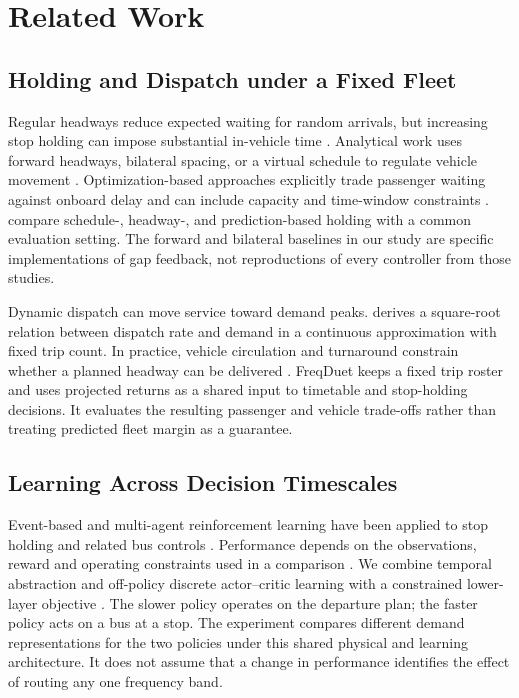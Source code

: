 \section{Related Work}
\label{sec:related}

\subsection{Holding and Dispatch under a Fixed Fleet}
Regular headways reduce expected waiting for random arrivals, but increasing stop holding can impose substantial in-vehicle time \citep{welding1957instability,osuna1972control}. Analytical work uses forward headways, bilateral spacing, or a virtual schedule to regulate vehicle movement \citep{daganzo2009headway,daganzo2011cooperation,xuan2011dynamic}. Optimization-based approaches explicitly trade passenger waiting against onboard delay and can include capacity and time-window constraints \citep{eberlein2001holding,hickman2001analytic,delgado2012much,sanchez2016realtime}. \citet{berrebi2018comparing} compare schedule-, headway-, and prediction-based holding with a common evaluation setting. The forward and bilateral baselines in our study are specific implementations of gap feedback, not reproductions of every controller from those studies.

Dynamic dispatch can move service toward demand peaks. \citet{newell1971dispatching} derives a square-root relation between dispatch rate and demand in a continuous approximation with fixed trip count. In practice, vehicle circulation and turnaround constrain whether a planned headway can be delivered \citep{ibarra2015planning,ceder2016public,gkiotsalitis2019robust}. FreqDuet keeps a fixed trip roster and uses projected returns as a shared input to timetable and stop-holding decisions. It evaluates the resulting passenger and vehicle trade-offs rather than treating predicted fleet margin as a guarantee.

\subsection{Learning Across Decision Timescales}
Event-based and multi-agent reinforcement learning have been applied to stop holding and related bus controls \citep{chen2016marl,alesiani2018rl,wang2020dynamic,wang2021asynchronous}. Performance depends on the observations, reward and operating constraints used in a comparison \citep{xu2025systematic}. We combine temporal abstraction and off-policy discrete actor--critic learning \citep{sutton1999between,haarnoja2018soft,christodoulou2019discrete,chen2021redq} with a constrained lower-layer objective \citep{altman1999constrained,stooke2020responsive}. The slower policy operates on the departure plan; the faster policy acts on a bus at a stop. The experiment compares different demand representations for the two policies under this shared physical and learning architecture. It does not assume that a change in performance identifies the effect of routing any one frequency band.
